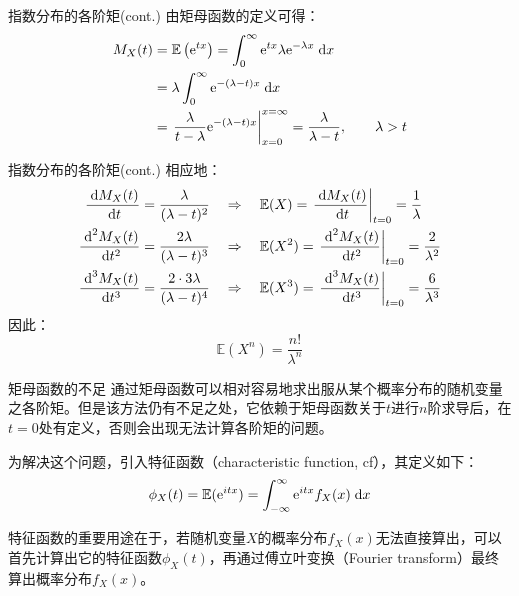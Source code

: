 \documentclass[t]{beamer}
\newcommand{\dif}{{\;\rm d}}
\newcommand{\E}{\mathbb{E}}
\begin{document}
  \begin{frame}{指数分布的各阶矩(cont.)}
    由矩母函数的定义可得：
    \begin{equation*}\begin{split}
    M_X(t)&=\E\left({\rm e}^{tx}\right)=\int^{\infty}_0 {\rm
    e}^{tx}\lambda {\rm e}^{-\lambda x}\dif x\\
    &=\lambda \int^{\infty}_0 {\rm e}^{-(\lambda-t)x}\dif x\\
    &=\left.\frac{\lambda}{t-\lambda}{\rm
    e}^{-(\lambda-t)x}\right|^{x=\infty}_{x=0}=\frac{\lambda}{\lambda-t},\qquad
    \lambda>t
    \end{split} \end{equation*}
  \end{frame}


  \begin{frame}{指数分布的各阶矩(cont.)}
    相应地：
    \begin{equation*}\begin{split}
    \frac{\dif M_X(t)}{\dif
    t}=\frac{\lambda}{(\lambda-t)^2}&\quad\Rightarrow\quad \E
    (X)=\left.\frac{\dif M_X(t)}{\dif
    t}\right|_{t=0}=\frac{1}{\lambda}\\
    \frac{\dif^2 M_X(t)}{\dif
    t^2}=\frac{2\lambda}{(\lambda-t)^3}&\quad\Rightarrow\quad \E
    (X^2)=\left.\frac{\dif^2 M_X(t)}{\dif
    t^2}\right|_{t=0}=\frac{2}{\lambda^2}\\
    \frac{\dif^3 M_X(t)}{\dif t^3}=\frac{2\cdot
    3\lambda}{(\lambda-t)^4}&\quad\Rightarrow\quad \E
    (X^3)=\left.\frac{\dif^3 M_X(t)}{\dif
    t^3}\right|_{t=0}=\frac{6}{\lambda^3}\\
    \end{split}\end{equation*}
    因此：$$\E (X^n)=\frac{n!}{\lambda^n}$$
  
  \end{frame}
  
  \begin{frame}{矩母函数的不足}
    通过矩母函数可以相对容易地求出服从某个概率分布的随机变量之各阶矩。但是该方法仍有不足之处，它依赖于矩母函数关于$t$进行$n$阶求导后，在$t=0$处有定义，否则会出现无法计算各阶矩的问题。

    为解决这个问题，引入特征函数（characteristic function, cf），其定义如下：
    \begin{equation*}\phi_X(t)=\E({\rm
    e}^{itx})=\int^{\infty}_{-\infty} {\rm e}^{itx}f_X(x)\dif x
    \end{equation*}
  
    特征函数的重要用途在于，若随机变量$X$的概率分布$f_X(x)$无法直接算出，可以首先计算出它的特征函数$\phi_X(t)$，再通过傅立叶变换（Fourier
transform）最终算出概率分布$f_X(x)$。
  \end{frame}
\end{document}
